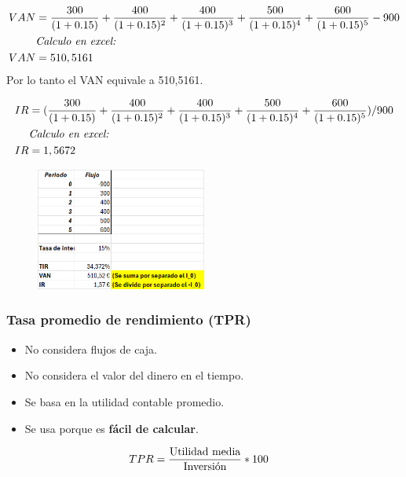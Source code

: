 \documentclass{templateNote}
\begin{document}
\begin{align*}
    VAN &= \frac{300}{(1+0.15)} + \frac{400}{(1+0.15)^2} + \frac{400}{(1+0.15)^3} + \frac{500}{(1+0.15)^4} + \frac{600}{(1+0.15)^5} - 900 \\
    &\textnormal{\textit{Calculo en excel:}}\\
    VAN &= 510,5161
\end{align*}
Por lo tanto el VAN equivale a 510,5161.

\begin{align*}
    IR &= (\frac{300}{(1+0.15)} + \frac{400}{(1+0.15)^2} + \frac{400}{(1+0.15)^3} + \frac{500}{(1+0.15)^4} + \frac{600}{(1+0.15)^5})/900 \\
    &\textnormal{\textit{Calculo en excel:}}\\
    IR &= 1,5672
\end{align*}

\begin{figure}[H]
    \centering
    \includegraphics[width=0.5\textwidth]{img/EjemploCalculo.png}
\end{figure}


\subsubsection{Tasa promedio de rendimiento (TPR)}

\begin{itemize}
    \item No considera flujos de caja.
    \item No considera el valor del dinero en el tiempo.
    \item Se basa en la utilidad contable promedio.
    \item Se usa porque es \textbf{fácil de calcular}.
\end{itemize}

\begin{align*}
    TPR &= \frac{\textnormal{Utilidad media}}{\textnormal{Inversión}} * 100
\end{align*}
\end{document}
